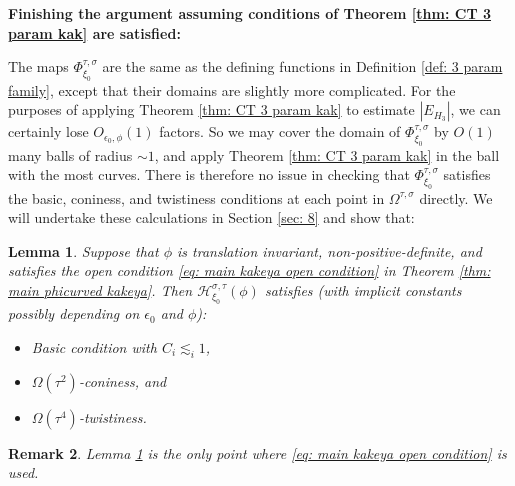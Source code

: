 \documentclass[12pt]{amsart}
\numberwithin{equation}{section}
\newtheorem{lemma}{Lemma}[section]
\newtheorem{remark}[lemma]{Remark}
\newcommand{\1}{\mathbbm{1}}
\begin{document}
\noindent \textbf{Finishing the argument assuming conditions of Theorem \ref{thm: CT 3 param kak} are satisfied: }

The maps $\Phi_{\xi_0}^{\tau, \sigma}$ are the same as the defining functions in Definition \ref{def: 3 param family}, except that their domains are slightly more complicated. 
For the purposes of applying Theorem \ref{thm: CT 3 param kak} to estimate $|E_{H_3}|$, we can certainly lose $O_{\epsilon_0, \phi}(1)$ factors. So we may cover the domain of $\Phi_{\xi_0}^{\tau, \sigma}$ by $O(1)$ many balls of radius $\sim 1$, and apply Theorem \ref{thm: CT 3 param kak} in the ball with the most curves. There is therefore no issue in checking that $\Phi_{\xi_0}^{\tau, \sigma}$ satisfies the basic, coniness, and twistiness conditions at each point in $\Omega^{\tau, \sigma}$ directly. We will undertake these calculations in Section \ref{sec: 8} and show that:
\begin{lemma}\label{lem: hairbrushes satisfy conditions}
    Suppose that $\phi$ is translation invariant, non-positive-definite, and satisfies the open condition \eqref{eq: main kakeya open condition} in Theorem \ref{thm: main phicurved kakeya}. Then $\mathcal H_{\xi_0}^{\sigma, \tau}(\phi)$ satisfies (with implicit constants possibly depending on $\epsilon_0$ and $\phi$):
    \begin{itemize}
        \item Basic condition with $C_i \lesssim_i 1$,
        \item $\Omega(\tau^2)$-coniness, and
        \item $\Omega(\tau^4)$-twistiness.
    \end{itemize}
\end{lemma}

\begin{remark}
    Lemma \ref{lem: hairbrushes satisfy conditions} is the only point where \eqref{eq: main kakeya open condition} is used. 
\end{remark}
\end{document}
